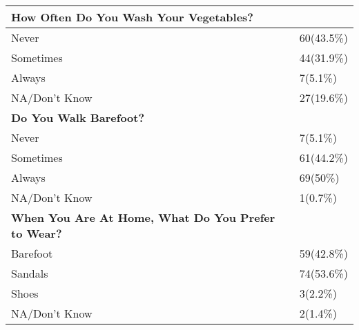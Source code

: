 \documentclass[6pt,letterpaper]{article}
\begin{document}
\begin{tabular}{|l  l|}
\hline
\textbf{How Often Do You Wash Your Vegetables?} \\
\hline
Never & 60(43.5\%) \\
Sometimes & 44(31.9\%) \\
Always & 7(5.1\%) \\
NA/Don't Know & 27(19.6\%) \\
\hline
\textbf{Do You Walk Barefoot?} \\
\hline
Never & 7(5.1\%) \\
Sometimes & 61(44.2\%) \\
Always & 69(50\%) \\
NA/Don't Know & 1(0.7\%) \\
\hline
\textbf{When You Are At Home, What Do You Prefer to Wear?} \\
\hline
Barefoot & 59(42.8\%) \\
Sandals & 74(53.6\%) \\
Shoes & 3(2.2\%) \\
NA/Don't Know & 2(1.4\%) \\
\hline
\end{tabular}
\end{document}
